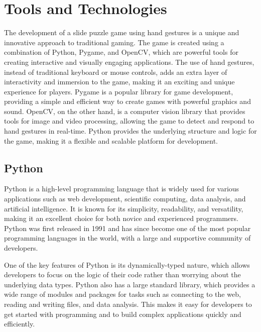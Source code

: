 \chapter{Tools and Technologies} %
\label{cha:chapter 2 label} %
The development of a slide puzzle game using hand gestures is a unique and innovative approach to traditional gaming. The game is created using a combination of Python, Pygame, and OpenCV, which are powerful tools for creating interactive and visually engaging applications. The use of hand gestures, instead of traditional keyboard or mouse controls, adds an extra layer of interactivity and immersion to the game, making it an exciting and unique experience for players.
Pygame is a popular library for game development, providing a simple and efficient way to create games with powerful graphics and sound. OpenCV, on the other hand, is a computer vision library that provides tools for image and video processing, allowing the game to detect and respond to hand gestures in real-time. Python provides the underlying structure and logic for the game, making it a flexible and scalable platform for development.

\section{Python}
Python is a high-level programming language that is widely used for various applications such as web development, scientific computing, data analysis, and artificial intelligence. It is known for its simplicity, readability, and versatility, making it an excellent choice for both novice and experienced programmers. Python was first released in 1991 and has since become one of the most popular programming languages in the world, with a large and supportive community of developers.

One of the key features of Python is its dynamically-typed nature, which allows developers to focus on the logic of their code rather than worrying about the underlying data types. Python also has a large standard library, which provides a wide range of modules and packages for tasks such as connecting to the web, reading and writing files, and data analysis. This makes it easy for developers to get started with programming and to build complex applications quickly and efficiently.

